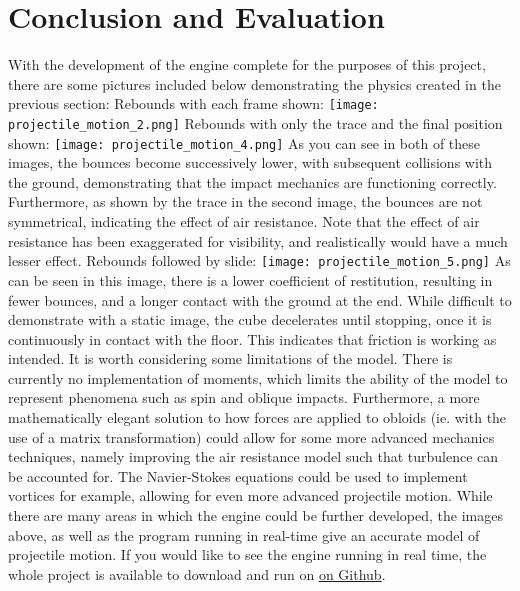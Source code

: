 \documentclass{article}
\begin{document}
\section{Conclusion and Evaluation}
With the development of the engine complete for the purposes of this project, there are some pictures included below demonstrating the physics created in the previous section:
\newline
\newline
\newline
Rebounds with each frame shown:
\newline
\texttt{[image: projectile\_motion\_2.png]}
\newline
\newline
\newline
Rebounds with only the trace and the final position shown:
\newline
\texttt{[image: projectile\_motion\_4.png]}
\newline
As you can see in both of these images, the bounces become successively lower, with subsequent collisions with the ground, demonstrating that the impact mechanics are functioning correctly.
\newline
Furthermore, as shown by the trace in the second image, the bounces are not symmetrical, indicating the effect of air resistance. Note that the effect of air resistance has been exaggerated for visibility, and realistically would have a much lesser effect.
\newpage
Rebounds followed by slide:
\newline
\newline
\texttt{[image: projectile\_motion\_5.png]}
\newline
As can be seen in this image, there is a lower coefficient of restitution, resulting in fewer bounces, and a longer contact with the ground at the end. While difficult to demonstrate with a static image, the cube decelerates until stopping, once it is continuously in contact with the floor. This indicates that friction is working as intended.
\newline
\newline
\newline
It is worth considering some limitations of the model. There is currently no implementation of moments, which limits the ability of the model to represent phenomena such as spin and oblique impacts. Furthermore, a more mathematically elegant solution to how forces are applied to obloids (ie. with the use of a matrix transformation) could allow for some more advanced mechanics techniques, namely improving the air resistance model such that turbulence can be accounted for. The Navier-Stokes equations 
\cite{turb}
could be used to implement vortices for example, allowing for even more advanced projectile motion.
\newline
\newline
While there are many areas in which the engine could be further developed, the images above, as well as the program running in real-time give an accurate model of projectile motion. If you would like to see the engine running in real time, the whole project is available to download and run on \href{https://github.com/maximwebb/3D-engine}{\color{blue} on Github}\color{black}.
\end{document}
